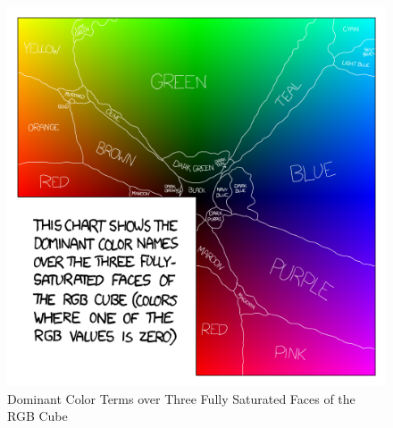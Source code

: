 \begin{figure}[hbt!]\centering
\includegraphics[width=.6\textwidth]{image/general/xkcd.png}
\caption{Dominant Color Terms over Three Fully Saturated Faces of the RGB Cube}
\label{fig:xkcd}
\end{figure}


